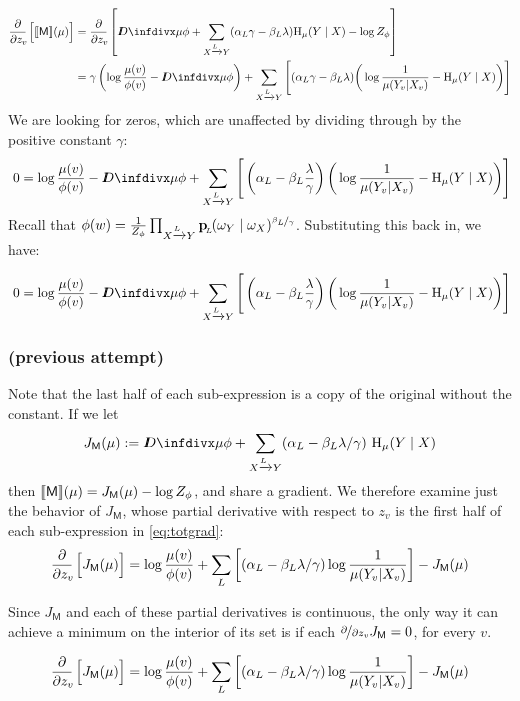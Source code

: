 \documentclass{article}
\newcommand{\bp}[1][L]{\mat{p}_{\!_#1\!}}
\newcommand{\sfM}{\mathsf M}
\newcommand{\alle}[1][L]{_{ X \xrightarrow{\!\!#1} Y }}
\begin{document}
	\begin{equation}
	\begin{aligned}
		\pz{\bbr{\sfM}(\mu)} &= 
		\pz{\kldiv{\mu}{\phi} + \sum\alle (\alpha_L \gamma - \beta_L \lambda ) \H_\mu(Y \mid X) - \log Z_\phi }\\
			&= 
			\gamma \left(\log\frac{\mu(v)}{\phi(v)} - \kldiv{\mu}{\phi} \right) + \sum\alle\Bigg[ (\alpha_L \gamma - \beta_L \lambda ) \bigg(\log \frac{1}{\mu(Y_v | X_v)} - \H_\mu(Y \mid X) \bigg) \Bigg] 
	\end{aligned}\label{eq:totgrad}
	\end{equation}
	We are looking for zeros, which are unaffected by dividing through by the positive constant $\gamma$:
	\[\ 0 = \log\frac{\mu(v)}{\phi(v)} - \kldiv{\mu}{\phi} + \sum\alle\Bigg[ \left(\alpha_L  - \beta_L \frac{\lambda}{\gamma} \right) \bigg(\log \frac{1}{\mu(Y_v | X_v)} - \H_\mu(Y \mid X) \bigg) \Bigg]  \]
	Recall that $\phi(w) = \frac{1}{Z_{\phi}}\prod\alle \bp(\omega_Y \mid \omega_X)^{\nicefrac{\beta_L}{\gamma}}$. Substituting this back in, we have:
	
	\[\ 0 = \log\frac{\mu(v)}{\phi(v)} - \kldiv{\mu}{\phi} + \sum\alle\Bigg[ \left(\alpha_L  - \beta_L \frac{\lambda}{\gamma} \right) \bigg(\log \frac{1}{\mu(Y_v | X_v)} - \H_\mu(Y \mid X) \bigg) \Bigg]  \]
	
	\subsubsection*{(previous attempt)}

	Note that the last half of each sub-expression is a copy of the original without the constant. If we let
	\[ J_\sfM(\mu) := \kldiv{\mu}{\phi} + \sum\alle (\alpha_L  - \beta_L \lambda / \gamma ) \ \H_\mu(Y \mid X) \]
	then $\bbr{\sfM}(\mu) = J_\sfM(\mu) - \log Z_\phi$, and share a gradient. We therefore examine just the behavior of $J_\sfM$, whose partial derivative with respect to $z_v$ is the first half of each sub-expression in \eqref{eq:totgrad}:
	\[ \pz{J_\sfM(\mu)} = \log\frac{\mu(v)}{\phi(v)} + \sum_L\left[ (\alpha_L  - \beta_L \lambda / \gamma ) \log \frac{1}{\mu(Y_v | X_v)} \right] - J_\sfM(\mu) \] 
	
	
	Since $J_\sfM$ and each of these partial derivatives is continuous, the only way it can achieve a minimum on the interior of its set is if each $\nicefrac{\partial}{\partial z_v} J_\sfM = 0$, for every $v$. 
	
	\[ \pz{J_\sfM(\mu)} = \log\frac{\mu(v)}{\phi(v)} + \sum_L\left[ (\alpha_L  - \beta_L \lambda / \gamma ) \log \frac{1}{\mu(Y_v | X_v)} \right] - J_\sfM(\mu) \] 
	
\end{document}
